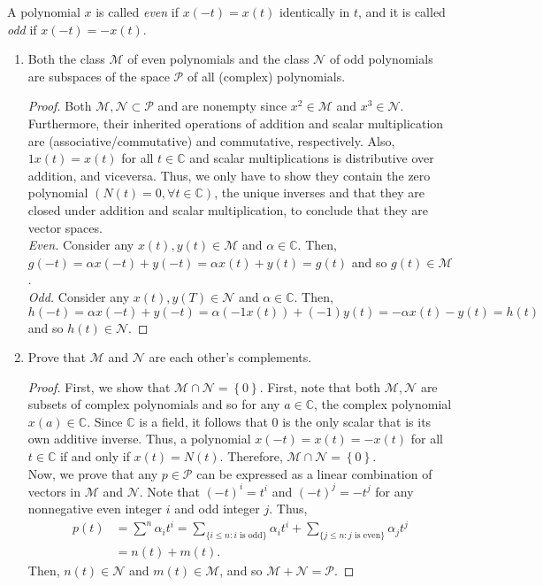\documentclass[12pt]{article}
\newenvironment{problem}[2][Problem]{\begin{trivlist} \item[\hskip \labelsep {\bfseries #1}\hskip \labelsep {\bfseries #2.}]}{\end{trivlist}}
\begin{document}
\begin{problem}{8}
  A polynomial $x$ is called \textit{even} if $x(-t)=x(t)$ identically in $t$, and it is called \textit{odd} if $x(-t) = -x(t)$. 
\begin{enumerate}
  \item Both the class $\mathcal{M}$ of even polynomials and the class $\mathcal{N}$ of odd polynomials are subspaces of the space $\mathcal{P}$ of all (complex) polynomials.
\begin{proof}
  Both $\mathcal{M},\mathcal{N}\subset \mathcal{P}$ and are nonempty since $x^{2}\in\mathcal{M}$ and $x^{3}\in\mathcal{N}$. Furthermore, their inherited operations of addition and scalar multiplication are (associative/commutative) and commutative, respectively. Also, $1x(t) = x(t)$ for all $t\in \mathbb{C}$ and scalar multiplications is distributive over addition, and viceversa. Thus, we only have to show they contain the zero polynomial $(N(t) = 0, \forall t\in \mathbb{C})$, the unique inverses and that they are closed under addition and scalar multiplication, to conclude that they are vector spaces.\\

  \textit{Even.} Consider any $x(t),y(t)\in \mathcal{M}$ and $\alpha\in\mathbb{C}$. Then, $g(-t) = \alpha x(-t) + y(-t) = \alpha x(t) + y(t) = g(t)$ and so $g(t)\in \mathcal{M}$.\\

  \textit{Odd.} Consider any $x(t),y(T)\in \mathcal{N}$ and $\alpha\in\mathbb{C}$. Then, $h(-t) = \alpha x(-t) + y(-t) = \alpha (-1x(t)) + (-1)y(t) = -\alpha x(t) -y(t) = h(t)$ and so $h(t)\in \mathcal{N}$.
\end{proof}
  \item Prove that $\mathcal{M}$ and $\mathcal{N}$ are each other's complements.
\begin{proof}
  First, we show that $\mathcal{M}\cap \mathcal{N} = \left\{ 0 \right\}$. First, note that both $\mathcal{M},\mathcal{N}$ are subsets of complex polynomials and so for any $a\in \mathbb{C}$, the complex polynomial $x(a)\in \mathbb{C}$. Since $\mathbb{C}$ is a field, it follows that $0$ is the only scalar that is its own additive inverse. Thus, a polynomial $x(-t) = x(t)=-x(t)$ for all $t\in \mathbb{C}$ if and only if $x(t) = N(t)$. Therefore, $\mathcal{M}\cap \mathcal{N} = \left\{ 0 \right\}$.\\

  Now, we prove that any $p\in \mathcal{P}$ can be expressed as a linear combination of vectors in $\mathcal{M}$ and $\mathcal{N}$. Note that $(-t)^{i} = t^{i}$ and $(-t)^{j} = -t^{j}$ for any nonnegative even integer $i$ and odd integer $j$. Thus, 
\begin{align*}
  p(t) &= \sum^{n} \alpha_{i}t^{i} = \sum_{\{i\leq n: i\text{ is odd}\}} \alpha_{i}t^{i} + \sum_{\{j\leq n:j\text{ is even}\}}\alpha_{j}t^{j}\\
  &= n(t)+m(t).
\end{align*}
Then, $n(t)\in\mathcal{N}$ and $m(t) \in \mathcal{M}$, and so $\mathcal{M}+\mathcal{N} = \mathcal{P}$.
\end{proof}
\end{enumerate}
\end{problem}
\end{document}

